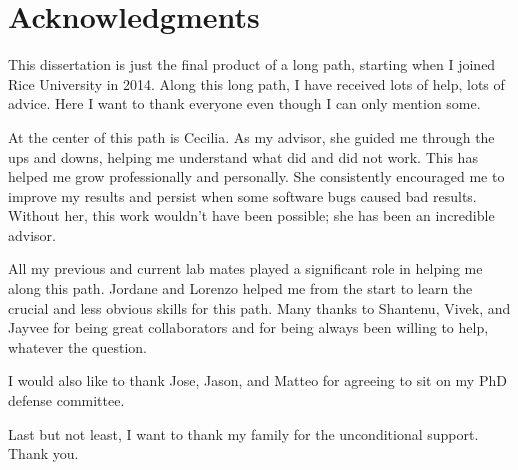\chapter*{Acknowledgments}


This dissertation is just the final product of a long path, starting when I joined Rice University in 2014.
Along this long path, I have received lots of help, lots of advice. Here I want to thank everyone even though 
I can only mention some.

At the center of this path is Cecilia. As my advisor, she guided me through the ups and downs, helping me understand what did and did not work. This has helped me grow professionally
and personally.
She consistently encouraged me to improve my results and persist when some software bugs caused bad results. Without her, this work wouldn't have been possible; she has been an incredible advisor. 

All my previous and current lab mates played a significant role in helping me along this path. Jordane and Lorenzo helped me from the start to learn the crucial and less obvious skills for this path. Many thanks to Shantenu, Vivek, and Jayvee for being great collaborators and for being always been willing to help, whatever the question.


I would also like to thank Jose, Jason, and Matteo for agreeing to sit on my PhD defense committee.

Last but not least, I want to thank my family for the unconditional support. Thank you.
